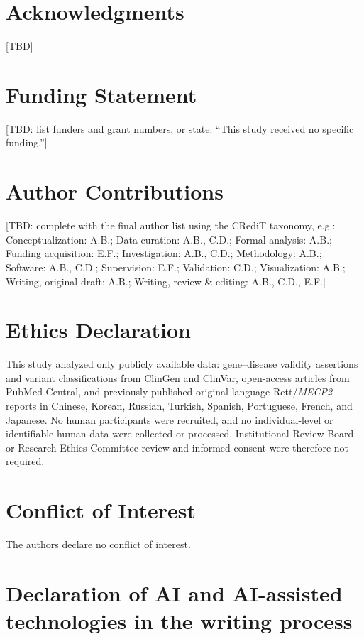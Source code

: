 \documentclass[preprint,12pt]{elsarticle}
\begin{document}
\section*{Acknowledgments}

[TBD]

\section*{Funding Statement}

[TBD: list funders and grant numbers, or state: ``This study received
no specific funding.'']

\section*{Author Contributions}

[TBD: complete with the final author list using the CRediT taxonomy,
e.g.: Conceptualization: A.B.; Data curation: A.B., C.D.; Formal analysis:
A.B.; Funding acquisition: E.F.; Investigation: A.B., C.D.; Methodology:
A.B.; Software: A.B., C.D.; Supervision: E.F.; Validation: C.D.;
Visualization: A.B.; Writing, original draft: A.B.; Writing, review \&
editing: A.B., C.D., E.F.]

\section*{Ethics Declaration}

This study analyzed only publicly available data: gene--disease validity
assertions and variant classifications from ClinGen and ClinVar,
open-access articles from PubMed Central, and previously published
original-language Rett/\textit{MECP2} reports in Chinese, Korean,
Russian, Turkish, Spanish, Portuguese, French, and Japanese. No human participants were
recruited, and no individual-level or identifiable human data were
collected or processed. Institutional Review Board or Research Ethics
Committee review and informed consent were therefore not required.

\section*{Conflict of Interest}

The authors declare no conflict of interest.

\section*{Declaration of AI and AI-assisted technologies in the writing
process}
\end{document}
